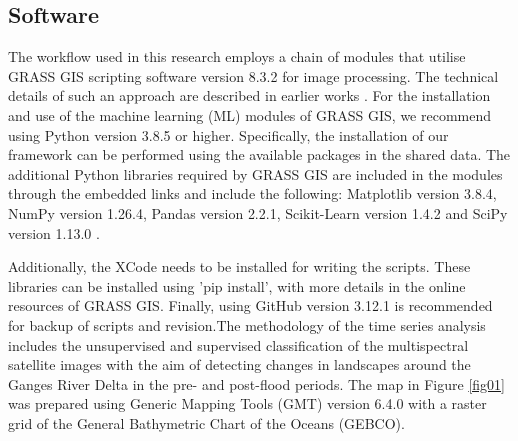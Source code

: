 \documentclass[water,article,accept,pdftex,oneauhor]{Definitions/mdpi}
\begin{document}
\subsection{Software} %
The workflow used in this research employs a chain of modules that {utilise} GRASS GIS scripting software version 8.3.2 %
 \cite{GRASS_GIS_software} for image processing{. The technical details of such an approach are }described in earlier works \cite{Lemenkova202323,technologies11020046}. For the installation and use of the machine learning (ML) modules of GRASS GIS, we recommend using Python version 3.8.5 or higher. Specifically, the installation of our framework can be performed using the available packages in the shared data. The additional Python libraries required by GRASS GIS are included in the modules through {the} embedded links and include the following: Matplotlib version 3.8.4, NumPy version 1.26.4, Pandas version 2.2.1, Scikit-Learn version 1.4.2 and SciPy version 1.13.0 %
. 

Additionally, the XCode {needs} to be installed for writing the scripts{.}  These libraries can be installed using 'pip install', with more details in the online resources of GRASS GIS.  {Finally, }using GitHub version 3.12.1 %
 is recommended {for backup of scripts and revision}.The methodology of {the} time series analysis includes the unsupervised and supervised classification of {the} multispectral satellite images {with the aim of} detecting changes in landscapes around the Ganges River Delta in {the} pre- and post-flood periods. The map in Figure \ref{fig01} was prepared using Generic Mapping Tools (GMT) version 6.4.0 \cite{Wessel,WesselSmith} with a raster grid of the General Bathymetric Chart of the Oceans (GEBCO). 

\end{document}
